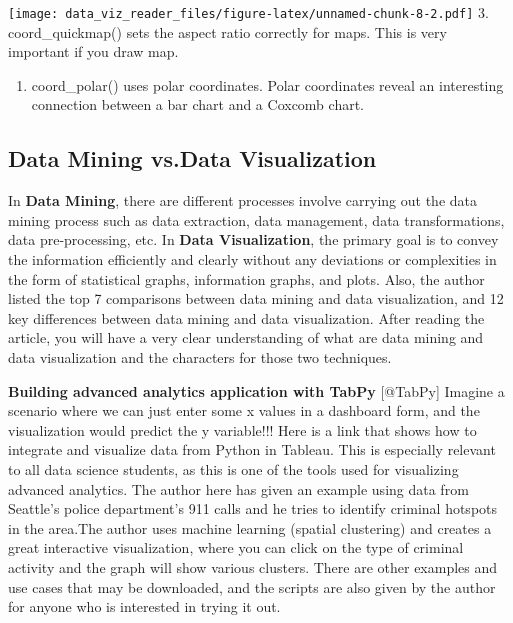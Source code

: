 \documentclass[]{book}
\providecommand{\tightlist}{%
  \setlength{\itemsep}{0pt}\setlength{\parskip}{0pt}}
\theoremstyle{definition}
\theoremstyle{definition}
\theoremstyle{definition}
\theoremstyle{remark}
\begin{document}
\texttt{[image: data\_viz\_reader\_files/figure-latex/unnamed-chunk-8-2.pdf]}
3. coord\_quickmap() sets the aspect ratio correctly for maps. This is
very important if you draw map.

\begin{enumerate}
\def\labelenumi{\arabic{enumi}.}
\setcounter{enumi}{3}
\tightlist
\item
  coord\_polar() uses polar coordinates. Polar coordinates reveal an
  interesting connection between a bar chart and a Coxcomb chart.
\end{enumerate}

\subsection{Data Mining vs.Data
Visualization}\label{data-mining-vs.data-visualization}

In \textbf{Data Mining}, there are different processes involve carrying
out the data mining process such as data extraction, data management,
data transformations, data pre-processing, etc. In \textbf{Data
Visualization}, the primary goal is to convey the information
efficiently and clearly without any deviations or complexities in the
form of statistical graphs, information graphs, and plots. Also, the
author listed the top 7 comparisons between data mining and data
visualization, and 12 key differences between data mining and data
visualization. After reading the article, you will have a very clear
understanding of what are data mining and data visualization and the
characters for those two techniques.

\textbf{Building advanced analytics application with TabPy} {[}@TabPy{]}
Imagine a scenario where we can just enter some x values in a dashboard
form, and the visualization would predict the y variable!!! Here is a
link that shows how to integrate and visualize data from Python in
Tableau. This is especially relevant to all data science students, as
this is one of the tools used for visualizing advanced analytics. The
author here has given an example using data from Seattle's police
department's 911 calls and he tries to identify criminal hotspots in the
area.The author uses machine learning (spatial clustering) and creates a
great interactive visualization, where you can click on the type of
criminal activity and the graph will show various clusters. There are
other examples and use cases that may be downloaded, and the scripts are
also given by the author for anyone who is interested in trying it out.
\end{document}
